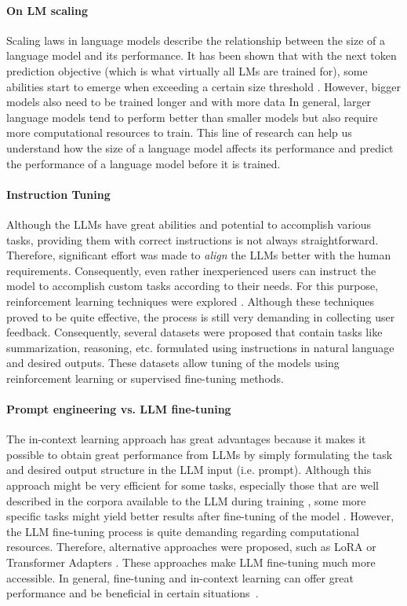 \paragraph{On LM scaling}
Scaling laws in language models describe the relationship between the size of a language model and its performance.
It has been shown that with the next token prediction objective (which is what virtually all LMs are trained for), some abilities start to emerge when exceeding a certain size threshold \cite{kaplan2020scaling}.
However, bigger models also need to be trained longer and with more data \cite{hoffmann2022training}
In general, larger language models tend to perform better than smaller models but also require more computational resources to train.
This line of research can help us understand how the size of a language model affects its performance and predict the performance of a language model before it is trained.

\paragraph{Instruction Tuning}
Although the LLMs have great abilities and potential to accomplish various tasks, providing them with correct instructions is not always straightforward.
Therefore, significant effort was made to \emph{align} the LLMs better with the human requirements.
Consequently, even rather inexperienced users can instruct the model to accomplish custom tasks according to their needs.
For this purpose, reinforcement learning techniques were explored \cite{ziegler2019fine,ouyang2022training}.
Although these techniques proved to be quite effective, the process is still very demanding in collecting user feedback.
Consequently, several datasets were proposed \cite{supernaturalinstructions,black2022gpt} that contain tasks like summarization, reasoning, etc. formulated using instructions in natural language and desired outputs.
These datasets allow tuning of the models using reinforcement learning or supervised fine-tuning methods.

\paragraph{Prompt engineering vs. LLM fine-tuning}
The in-context learning approach has great advantages because it makes it possible to obtain great performance from LLMs by simply formulating the task and desired output structure in the LLM input (i.e. prompt).
Although this approach might be very efficient for some tasks, especially those that are well described in the corpora available to the LLM during training \cite{wei2022emergent}, some more specific tasks might yield better results after fine-tuning of the model \cite{tu-etal-2022-prompt}.
However, the LLM fine-tuning process is quite demanding regarding computational resources.
Therefore, alternative approaches were proposed, such as LoRA \cite{hu2021lora} or Transformer Adapters \cite{pfeiffer2020AdapterHub}.
These approaches make LLM fine-tuning much more accessible.
In general, fine-tuning and in-context learning can offer great performance and be beneficial in certain situations~\cite{mosbach-etal-2023-shot}.

